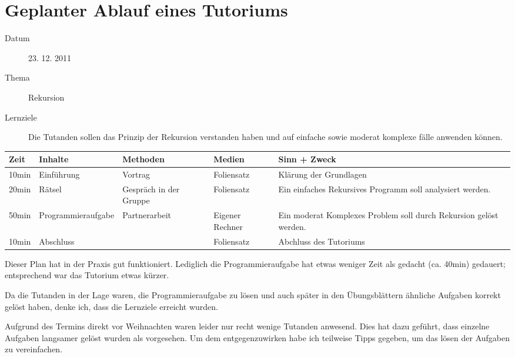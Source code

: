 \documentclass[%
fontsize=12pt,
paper=a4,
oneside,
DIV=13,
BCOR=0cm,
pagesize=automedia,
parskip=false,
headings=normal,
titlepage=true%
]{scrartcl}
\begin{document}
\section{Geplanter Ablauf eines Tutoriums}
\begin{description}
 \item[Datum] 23. 12. 2011
 \item[Thema] Rekursion
 \item[Lernziele] Die Tutanden sollen das Prinzip der Rekursion verstanden haben
                  und auf einfache sowie moderat komplexe f\"alle anwenden
                  k\"onnen.
\end{description}

   \begin{longtable}{l|p{2cm}|p{2.5cm}|p{2cm}|p{6.5cm}}
Zeit & Inhalte & Methoden & Medien & Sinn + Zweck\\
\hline
10min & Einf\"uhrung & Vortrag & Foliensatz & Kl\"arung der
Grundlagen\\
20min & R\"atsel & Gespr\"ach in der Grup\-pe &
Foliensatz & Ein einfaches Rekursives Programm soll analysiert werden.\\
50min & Pro\-gramm\-ier\-auf\-gabe & Partner\-arbeit & Eigener Rechner & Ein
moderat Komplexes Pro\-blem soll durch Rekursion ge\-l\"ost werden.\\
10min & Abschluss & & Foliensatz & Abchluss des Tutoriums\\
\end{longtable}
\vspace{1\baselineskip}

Dieser Plan hat in der Praxis gut funktioniert. Lediglich die Programmieraufgabe
hat etwas weniger Zeit als gedacht (ca. 40min) gedauert; entsprechend war das
Tutorium etwas k\"urzer.

Da die Tutanden in der Lage waren, die Programmieraufgabe zu l\"osen und auch
sp\"ater in den \"Ubungsbl\"attern \"ahnliche Aufgaben korrekt gel\"ost haben,
denke ich, dass die Lernziele erreicht wurden.

Aufgrund des Termins direkt vor Weihnachten waren leider nur recht wenige
Tutanden anwesend. Dies hat dazu gef\"uhrt, dass einzelne Aufgaben langsamer
gel\"ost wurden als vorgesehen. Um dem entgegenzuwirken habe ich teilweise
Tipps gegeben, um das l\"osen der Aufgaben zu vereinfachen.
\end{document}

